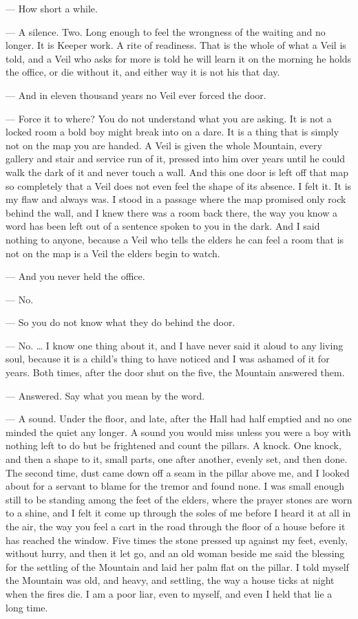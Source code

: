 \begin{room}
--- How short a while.

--- A silence. Two. Long enough to feel the wrongness of the waiting and no longer. It is Keeper work. A rite of readiness. That is the whole of what a Veil is told, and a Veil who asks for more is told he will learn it on the morning he holds the office, or die without it, and either way it is not his that day.

--- And in eleven thousand years no Veil ever forced the door.

--- Force it to where? You do not understand what you are asking. It is not a locked room a bold boy might break into on a dare. It is a thing that is simply not on the map you are handed. A Veil is given the whole Mountain, every gallery and stair and service run of it, pressed into him over years until he could walk the dark of it and never touch a wall. And this one door is left off that map so completely that a Veil does not even feel the shape of its absence. I felt it. It is my flaw and always was. I stood in a passage where the map promised only rock behind the wall, and I knew there was a room back there, the way you know a word has been left out of a sentence spoken to you in the dark. And I said nothing to anyone, because a Veil who tells the elders he can feel a room that is not on the map is a Veil the elders begin to watch.

--- And you never held the office.

--- No.

--- So you do not know what they do behind the door.

--- No. \ldots{} I know one thing about it, and I have never said it aloud to any living soul, because it is a child's thing to have noticed and I was ashamed of it for years. Both times, after the door shut on the five, the Mountain answered them.

--- Answered. Say what you mean by the word.

--- A sound. Under the floor, and late, after the Hall had half emptied and no one minded the quiet any longer. A sound you would miss unless you were a boy with nothing left to do but be frightened and count the pillars. A knock. One knock, and then a shape to it, small parts, one after another, evenly set, and then done. The second time, dust came down off a seam in the pillar above me, and I looked about for a servant to blame for the tremor and found none. I was small enough still to be standing among the feet of the elders, where the prayer stones are worn to a shine, and I felt it come up through the soles of me before I heard it at all in the air, the way you feel a cart in the road through the floor of a house before it has reached the window. Five times the stone pressed up against my feet, evenly, without hurry, and then it let go, and an old woman beside me said the blessing for the settling of the Mountain and laid her palm flat on the pillar. I told myself the Mountain was old, and heavy, and settling, the way a house ticks at night when the fires die. I am a poor liar, even to myself, and even I held that lie a long time.


\end{room}
